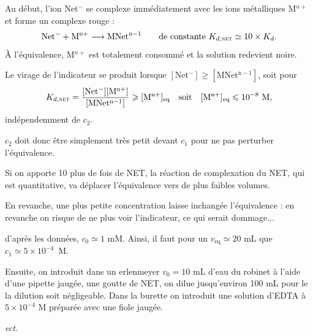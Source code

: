 \begin{solution}
\begin{questions}
    \question Au début, l'ion Net$^{-}$ se complexe immédiatement avec les ions métalliques M$^{n+}$ et forme un complexe rouge :
    $$\mathrm{Net^{-} + M^{n+} \longrightarrow MNet^{n-1}}\qquad\text{de constante } K_{d,\textsc{net}} \simeq 10 \times K_d.$$
    \`A l'équivalence, M$^{n+}$ est totalement consommé et la solution redevient noire.
    
    \question Le virage de l'indicateur se produit lorsque $\mathrm{[Net^{-}] \geqslant [MNet^{n-1}]}$, soit pour
    $$K_{d,\textsc{net}} = \mathrm{\dfrac{[Net^{-}][M^{n+}]}{[MNet^{n-1}]}} \geqslant \mathrm{[M^{n+}]_{eq}} \qqtext{soit} \mathrm{[M^{n+}]_{eq}} \leqslant 10^{-8}\text{ M},$$
    indépendemment de $c_2$.
    
    $c_2$ doit donc être simplement très petit devant $c_1$ pour ne pas perturber l'équivalence.
    
    
    
    \question Si on apporte 10 plus de fois de NET, la réaction de complexation du NET, qui est quantitative, va déplacer l'équivalence vers de plus faibles volumes.
    
    En revanche, une plus petite concentration laisse inchangée l'équivalence : en revanche on risque de ne plus voir l'indicateur, ce qui serait dommage...
    
     d'après les données, $c_0 \simeq 1$ mM. Ainsi, il faut pour un $v_\text{eq} \simeq 20$ mL que $c_1 \simeq 5\times 10^{-4}$~M.
    
    Ensuite, on introduit dans un erlenmeyer $v_0 = 10$ mL d'eau du robinet à l'aide d'une pipette jaugée, une goutte de NET, on dilue jusqu'environ 100 mL pour le la dilution soit négligeable. Dans la burette on introduit une solution d'EDTA à $5\times 10^{-4}$ M préparée avec une fiole jaugée.
    
    \emph{ect.}
    
\end{questions}
\end{solution}